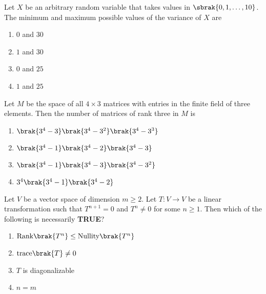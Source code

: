 \iffalse
                       
                        
                        
                        
                    
                        \author{AI24BTECH11006 - Bugada Roopansha}
                        \section{MA}
                        \chapter{2013}
                        \fi 
    \item Let $X$ be an arbitrary random variable that takes values in $\sbrak{0, 1, \dots, 10}$. The minimum and maximum possible values of the variance of $X$ are
    \begin{enumerate}
        \item $0$ and $30$
        \item $1$ and $30$
        \item $0$ and $25$
        \item $1$ and $25$
    \end{enumerate}

    \item Let $M$ be the space of all $4 \times 3$ matrices with entries in the finite field of three elements. Then the number of matrices of rank three in $M$ is
    \begin{enumerate}
        \item $\brak{3^4 - 3} \brak{3^{4} - 3^{2}} \brak{3^{4} - 3^{3}}$
        \item $\brak{3^4 - 1} \brak{3^4 - 2} \brak{3^4 - 3}$
        \item $\brak{3^4 -1} \brak{3^4 - 3} \brak{3^{4} - 3^{2}}$
        \item $3^4\brak{3^4 - 1} \brak{3^4 - 2}$
    \end{enumerate}

    \item Let $V$ be a vector space of dimension $m \geq 2$. Let $T: V \rightarrow V$ be a linear transformation such that $T^{n+1} = 0$ and $T^{n} \neq 0$ for some $n \geq 1$. Then which of the following is necessarily \textbf{TRUE}?
    \begin{enumerate}
        \item $\text{Rank} \brak{T^{n}} \leq \text{Nullity} \brak{T^{n}}$
        \item $\text{trace} \brak{T} \neq 0$
        \item $T$ is diagonalizable
        \item $n = m$
    \end{enumerate}

